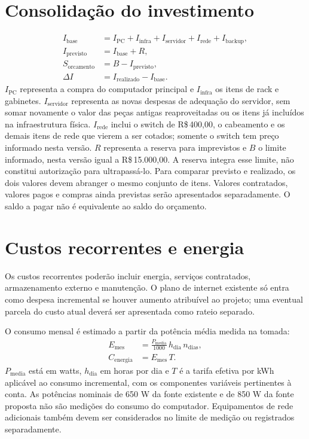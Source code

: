\documentclass[11pt,a4paper,oneside]{report}
\newcommand{\dinheiro}[1]{R\$\,#1}
\begin{document}
\section{Consolidação do investimento}
\begin{align}
I_{\mathrm{base}} &= I_{\mathrm{PC}} + I_{\mathrm{infra}} + I_{\mathrm{servidor}}
+ I_{\mathrm{rede}} + I_{\mathrm{backup}},\\
I_{\mathrm{previsto}} &= I_{\mathrm{base}} + R,\\
S_{\mathrm{orcamento}} &= B - I_{\mathrm{previsto}},\\
\Delta I &= I_{\mathrm{realizado}} - I_{\mathrm{base}}.
\end{align}
$I_{\mathrm{PC}}$ representa a compra do computador principal e
$I_{\mathrm{infra}}$ os itens de rack e gabinetes.
$I_{\mathrm{servidor}}$ representa as novas despesas de adequação do servidor,
sem somar novamente o valor das peças antigas reaproveitadas ou os itens
já incluídos na infraestrutura física.
$I_{\mathrm{rede}}$ inclui o switch de \dinheiro{400,00}, o cabeamento e
os demais itens de rede que vierem a ser cotados; somente o switch tem preço
informado nesta versão.
$R$ representa a reserva para imprevistos e $B$ o limite informado,
nesta versão igual a \dinheiro{15.000,00}. A reserva integra esse limite,
não constitui autorização para ultrapassá-lo. Para comparar
previsto e realizado, os dois valores devem abranger o mesmo conjunto de itens.
Valores contratados, valores pagos e compras ainda previstas serão apresentados
separadamente. O saldo a pagar não é equivalente ao saldo do orçamento.

\section{Custos recorrentes e energia}
Os custos recorrentes poderão incluir energia, serviços contratados,
armazenamento externo e manutenção. O plano de internet existente só entra
como despesa incremental se houver aumento atribuível ao projeto; uma eventual
parcela do custo atual deverá ser apresentada como rateio separado.

O consumo mensal é estimado a partir da potência média medida na tomada:
\begin{align}
E_{\mathrm{mes}} &= \frac{P_{\mathrm{media}}}{1000}\,h_{\mathrm{dia}}\,n_{\mathrm{dias}},\\
C_{\mathrm{energia}} &= E_{\mathrm{mes}}\,T.
\end{align}
$P_{\mathrm{media}}$ está em watts, $h_{\mathrm{dia}}$ em horas por dia e $T$ é
a tarifa efetiva por kWh aplicável ao consumo incremental, com os componentes
variáveis pertinentes à conta. As potências nominais de 650 W da fonte existente
e de 850 W da fonte proposta não são medições do consumo do computador.
Equipamentos de rede adicionais também
devem ser considerados no limite de medição ou registrados separadamente.
\end{document}
